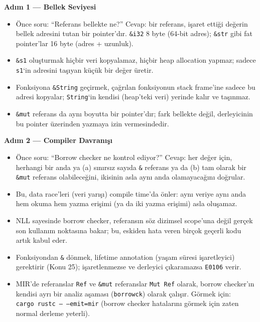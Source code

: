 \documentclass[12pt,a4paper]{article}
\begin{document}
\textbf{Adım 1 --- Bellek Seviyesi}

\begin{itemize}
\tightlist
\item
  Önce soru: ``Referans bellekte ne?'' Cevap: bir referans, işaret ettiği değerin bellek adresini tutan bir pointer'dır. \texttt{\&i32} 8 byte (64-bit adres); \texttt{\&str} gibi fat pointer'lar 16 byte (adres + uzunluk).
\item
  \texttt{\&s1} oluşturmak hiçbir veri kopyalamaz, hiçbir heap allocation yapmaz; sadece \texttt{s1}`in adresini taşıyan küçük bir değer üretir.
\item
  Fonksiyona \texttt{\&String} geçirmek, çağrılan fonksiyonun stack frame'ine sadece bu adresi kopyalar; \texttt{String}`in kendisi (heap'teki veri) yerinde kalır ve taşınmaz.
\item
  \texttt{\&mut} referans da aynı boyutta bir pointer'dır; fark bellekte değil, derleyicinin bu pointer üzerinden yazmaya izin vermesindedir.
\end{itemize}

\textbf{Adım 2 --- Compiler Davranışı}

\begin{itemize}
\tightlist
\item
  Önce soru: ``Borrow checker ne kontrol ediyor?'' Cevap: her değer için, herhangi bir anda ya (a) sınırsız sayıda \texttt{\&} referans ya da (b) tam olarak bir \texttt{\&mut} referans olabileceğini, ikisinin asla aynı anda olamayacağını doğrular.
\item
  Bu, data race'leri (veri yarışı) compile time'da önler: aynı veriye aynı anda hem okuma hem yazma erişimi (ya da iki yazma erişimi) asla oluşamaz.
\item
  NLL sayesinde borrow checker, referansın söz dizimsel scope'una değil gerçek son kullanım noktasına bakar; bu, eskiden hata veren birçok geçerli kodu artık kabul eder.
\item
  Fonksiyondan \texttt{\&} dönmek, lifetime annotation (yaşam süresi işaretleyici) gerektirir (Konu 25); işaretlenmezse ve derleyici çıkaramazsa \texttt{E0106} verir.
\item
  MIR'de referanslar \texttt{Ref} ve \texttt{\&mut} referanslar \texttt{Mut\ Ref} olarak, borrow checker'ın kendisi ayrı bir analiz aşaması (\texttt{borrowck}) olarak çalışır. Görmek için: \texttt{cargo\ rustc\ --\ --emit=mir} (borrow checker hatalarını görmek için zaten normal derleme yeterli).
\end{itemize}
\end{document}
